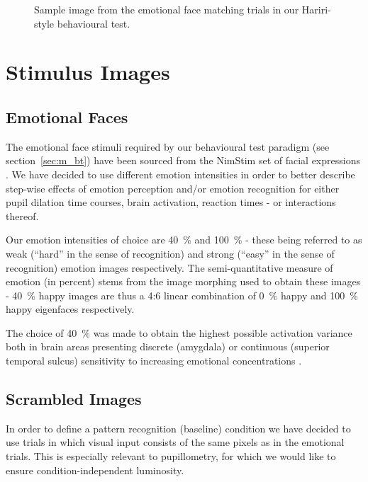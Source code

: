 	\begin{figure}[!h]
	    \caption{Sample image from the emotional face matching trials in our Hariri-style behavioural test.}
	    \label{fig:m_b_2}
	\end{figure}
		    
    \section{Stimulus Images}
	\subsection{Emotional Faces}\label{sec:m_vs_ef}
	    The emotional face stimuli required by our behavioural test paradigm (see section~\ref{sec:m_bt}) have been sourced from the NimStim set of facial expressions \citep{Tottenham2009}.
	    We have decided to use different emotion intensities in order to better describe step-wise effects of emotion perception and/or emotion recognition for either pupil dilation time courses, brain activation, reaction times - or interactions thereof.
	    
	    Our emotion intensities of choice are \SI{40}{\percent} and \SI{100}{\percent} - these being referred to as weak (“hard” in the sense of recognition) and strong (“easy” in the sense of recognition) emotion images respectively.
	    The semi-quantitative measure of emotion (in percent) stems from the image morphing used to obtain these images - \SI{40}{\percent} happy images are thus a 4:6 linear combination of \SI{0}{\percent} happy and \SI{100}{\percent} happy eigenfaces \citep{Zhang2008} respectively.
	    
	    The choice of \SI{40}{\percent} was made to obtain the highest possible activation variance both in brain areas presenting discrete (amygdala) or continuous (superior temporal sulcus) sensitivity to increasing emotional concentrations \citep{Harris2012}.
	\subsection{Scrambled Images}\label{sec:m_vs_si}
	    In order to define a pattern recognition (baseline) condition we have decided to use trials in which visual input consists of the same pixels as in the emotional trials.
	    This is especially relevant to pupillometry, for which we would like to ensure condition-independent luminosity.
	    

